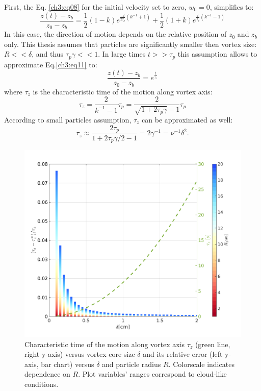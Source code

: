 \documentclass[../main.tex]{subfiles}
\begin{document}
First, the Eq. \ref{ch3:eq08} for the initial velocity set to zero, $w_0=0$, simplifies to:
\begin{equation}
\frac{z(t)-z_b}{z_0-z_b}=\frac{1}{2}\left(1-k\right) e^{\frac{-t}{2 \tau_p}(k^{-1}+1)}+\frac{1}{2}\left(1+k\right) e^{\frac{t}{\tau_p}(k^{-1}-1)}
\label{ch3:eq11}
\end{equation}
In this case, the direction of motion depends on the relative position of $z_0$ and $z_b$ only. This thesis assumes that particles are significantly smaller then vortex size: $R<<\delta$, and thus $\tau_p \gamma <<1$. In large times $t>>\tau_p$ this assumption allows to approximate Eq.\ref{ch3:eq11} to:
\begin{equation}
\frac{z(t)-z_b}{z_0-z_b}=e^{\frac{t}{\tau_z}}
\label{ch3:eq12}
\end{equation}
where $\tau_z$ is the characteristic time of the motion along vortex axis:
\begin{equation}
\tau_z=\frac{2}{k^{-1}-1} \tau_p=\frac{2}{\sqrt{1+2\tau_p \gamma}-1} \tau_p
\label{ch3:eq09}
\end{equation}
According to small particles assumption, $\tau_z$ can be approximated as well:
\begin{equation}
\tau_z\approx \frac{2 \tau_p}{1+ 2\tau_p \gamma/2 -1}=2\gamma^{-1}=\nu^{-1}\delta^2.
\label{ch3:eq10}
\end{equation}

\begin{figure}
\centering
\noindent \includegraphics[width=30pc]{gfx/tau_z_error_tau_z_vs_delta.png}
\caption{Characteristic time of the motion along vortex axis $\tau_z$ (green line, right y-axis) versus vortex core size $\delta$ and its relative error (left y-axis, bar chart) versus $\delta$ and particle radius $R$. Colorscale indicates dependence on $R$. Plot variables' ranges correspond to cloud-like conditions.}
\label{fig:ch3_1}
\end{figure}
\end{document}
